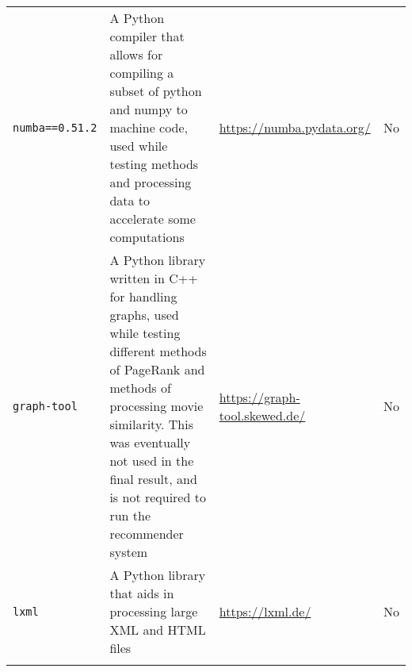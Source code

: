 \documentclass[11pt]{article}
\begin{document}
\begin{longtable}[]{@{}llll@{}}
\begin{minipage}[t]{0.22\columnwidth}\raggedright
\texttt{numba==0.51.2}\strut
\end{minipage} & \begin{minipage}[t]{0.22\columnwidth}\raggedright
A Python compiler that allows for compiling a subset of python and numpy
to machine code, used while testing methods and processing data to
accelerate some computations\strut
\end{minipage} & \begin{minipage}[t]{0.22\columnwidth}\raggedright
\url{https://numba.pydata.org/}\strut
\end{minipage} & \begin{minipage}[t]{0.22\columnwidth}\raggedright
No\strut
\end{minipage}\tabularnewline
\begin{minipage}[t]{0.22\columnwidth}\raggedright
\texttt{graph-tool}\strut
\end{minipage} & \begin{minipage}[t]{0.22\columnwidth}\raggedright
A Python library written in C++ for handling graphs, used while testing
different methods of PageRank and methods of processing movie
similarity. This was eventually not used in the final result, and is not
required to run the recommender system\strut
\end{minipage} & \begin{minipage}[t]{0.22\columnwidth}\raggedright
\url{https://graph-tool.skewed.de/}\strut
\end{minipage} & \begin{minipage}[t]{0.22\columnwidth}\raggedright
No\strut
\end{minipage}\tabularnewline
\begin{minipage}[t]{0.22\columnwidth}\raggedright
\texttt{lxml}\strut
\end{minipage} & \begin{minipage}[t]{0.22\columnwidth}\raggedright
A Python library that aids in processing large XML and HTML files\strut
\end{minipage} & \begin{minipage}[t]{0.22\columnwidth}\raggedright
\url{https://lxml.de/}\strut
\end{minipage} & \begin{minipage}[t]{0.22\columnwidth}\raggedright
No\strut
\end{minipage}\tabularnewline
\begin{minipage}[t]{0.22\columnwidth}\raggedright

\end{minipage}
\end{longtable}
\end{document}
